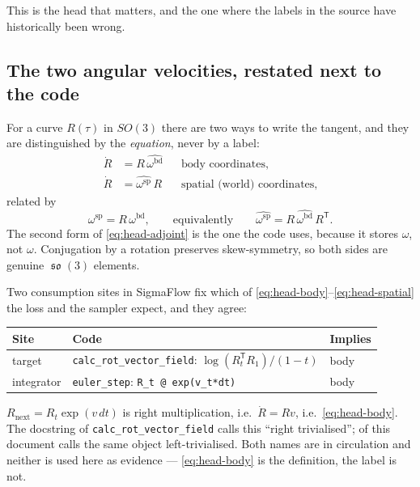 \documentclass[11pt,a4paper]{report}
\theoremstyle{definition}
\theoremstyle{remark}
\DeclareMathOperator{\so}{\mathfrak{so}}
\newcommand{\pyfunc}[1]{\texttt{#1}}
\begin{document}
This is the head that matters, and the one where the labels in the source
have historically been wrong.

\subsection{The two angular velocities, restated next to the code}

For a curve $R(\tau)$ in $SO(3)$ there are two ways to write the tangent, and
they are distinguished by the \emph{equation}, never by a label:
\begin{align}
\dot R &= R\,\widehat{\omega^{\mathrm{bd}}}
&&\text{body coordinates,} \label{eq:head-body}\\
\dot R &= \widehat{\omega^{\mathrm{sp}}}\,R
&&\text{spatial (world) coordinates,} \label{eq:head-spatial}
\end{align}
related by
\begin{equation}
\label{eq:head-adjoint}
\omega^{\mathrm{sp}} = R\,\omega^{\mathrm{bd}},
\qquad\text{equivalently}\qquad
\widehat{\omega^{\mathrm{sp}}} = R\,\widehat{\omega^{\mathrm{bd}}}\,R^{\mathsf T}.
\end{equation}
The second form of \eqref{eq:head-adjoint} is the one the code uses, because
it stores $\widehat\omega$, not $\omega$. Conjugation by a rotation preserves
skew-symmetry, so both sides are genuine $\so(3)$ elements.

Two consumption sites in SigmaFlow fix which of
\eqref{eq:head-body}--\eqref{eq:head-spatial} the loss and the sampler expect,
and they agree:
\begin{center}
\begin{tabular}{lll}
\toprule
Site & Code & Implies \\
\midrule
target & \pyfunc{calc\_rot\_vector\_field}: $\log(R_t^{\mathsf T}R_1)/(1-t)$ & body \\
integrator & \pyfunc{euler\_step}: \texttt{R\_t @ exp(v\_t*dt)} & body \\
\bottomrule
\end{tabular}
\end{center}
$R_{\text{next}}=R_t\exp(v\,dt)$ is right multiplication, i.e.\ $\dot R=Rv$,
i.e.\ \eqref{eq:head-body}. The docstring of \pyfunc{calc\_rot\_vector\_field}
calls this ``right trivialised'';  of this
document calls the same object left-trivialised. Both names are in
circulation and neither is used here as evidence --- \eqref{eq:head-body} is
the definition, the label is not.
\end{document}
